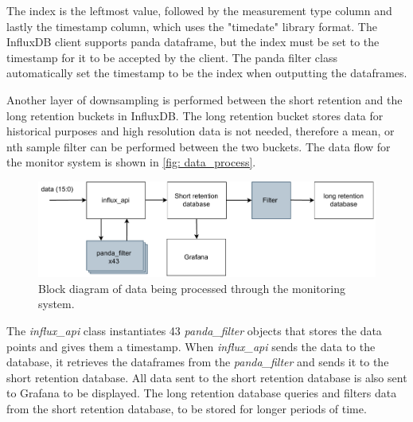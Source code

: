\documentclass[main.tex]{subfiles}
\begin{document}
The index is the leftmost value, followed by the measurement type column and lastly the timestamp column, which uses the "timedate" library format. The InfluxDB client supports panda dataframe, but the index must be set to the timestamp for it to be accepted by the client. The panda filter class automatically set the timestamp to be the index when outputting the dataframes.

Another layer of downsampling is performed between the short retention and the long retention buckets in InfluxDB. The long retention bucket stores data for historical purposes and high resolution data is not needed, therefore a mean, or nth sample filter can be performed between the two buckets. The data flow for the monitor system is shown in \autoref{fig: data_process}.

 \begin{figure}[!htpb]
    \centering
    \includegraphics[width=18cm, scale=1]{images/processing data overview.pdf}
    \caption{Block diagram of data being processed through the monitoring system.}
    \label{fig: data_process}
\end{figure}
\FloatBarrier 

The \textit{influx\_api} class instantiates 43 \textit{panda\_filter} objects that stores the data points and gives them a timestamp. When \textit{influx\_api} sends the data to the database, it retrieves the dataframes from the \textit{panda\_filter} and sends it to the short retention database. All data sent to the short retention database is also sent to Grafana to be displayed. The long retention database queries and filters data from the short retention database, to be stored for longer periods of time.

 

 
\end{document}
